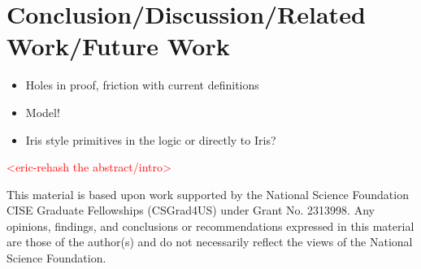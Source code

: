 \documentclass[acmsmall]{acmart}
\newcommand{\eric}[1]{\textcolor{red}{ <eric-#1> }}
\begin{document}
\section{Conclusion/Discussion/Related Work/Future Work}
\begin{itemize}
  \item Holes in proof, friction with current definitions
  \item Model!
  \item Iris style primitives in the logic or directly to Iris?
\end{itemize}
\eric{rehash the abstract/intro}


\begin{acks}
This material is based upon work supported by the National Science Foundation CISE Graduate Fellowships (CSGrad4US) under Grant No. 2313998. Any opinions, findings, and conclusions or recommendations expressed in this material are those of the author(s) and do not necessarily reflect the views of the National Science Foundation.
\end{acks}





\end{document}

